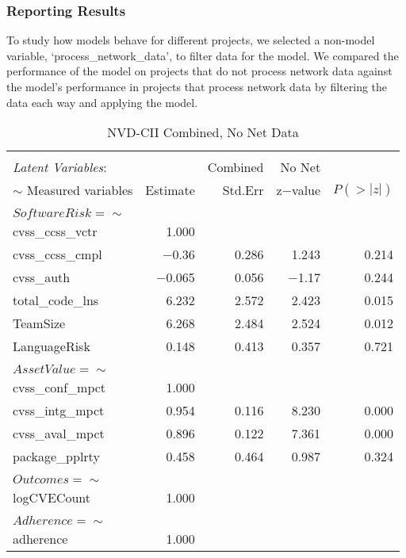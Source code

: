 \subsubsection{Reporting Results}
To study how models behave for different projects, we selected a non-model variable, `process\_network\_data', to filter data for the model. We compared the performance of the model on projects that do not process network data against the model's performance in projects that process network data by filtering the data each way and applying the model.

\begin{table}
	\begin{center}	
		\caption{NVD-CII Combined, No Net Data}
		\label{tab:results_combined1}
		\begin{tabular}{l|rrrr}
			\\[-1.8ex]\hline 
			\hline \\[-1.8ex] 
			\textit{Latent Variables}: &  & Combined & No Net & \\  
			$\sim$ Measured variables& Estimate & Std.Err & z$-$value & $P(>|z|)$ \\
			\hline \\[-1.8ex]
			$SoftwareRisk =\sim$  & & & & \\                                   
			cvss\_ccss\_vctr   & 1.000 & &  & \\                             
			cvss\_ccss\_cmpl &  $-$0.36 &   0.286 & 1.243 &   0.214\\
			cvss\_auth     &   $-$0.065  &  0.056  & $-$1.17   & 0.244\\
			total\_code\_lns  &  6.232 &   2.572 &   2.423 &   0.015\\
			TeamSize        &  6.268   & 2.484   & 2.524   & 0.012\\
			LanguageRisk    &  0.148  &  0.413   & 0.357   & 0.721\\ 
			& & & & \\  
			$AssetValue =\sim$     & & & & \\                                    		
		    cvss\_conf\_mpct  &  1.000  &	&	&                  \\
		    cvss\_intg\_mpct  &  0.954  &  0.116 &   8.230  &  0.000\\
		    cvss\_aval\_mpct  &  0.896 &   0.122 &   7.361 &   0.000\\
		    package\_pplrty  &  0.458 &   0.464  &  0.987 &   0.324\\	
			& & & & \\  
			$Outcomes =\sim$    & & & & \\                                     
			logCVECount     &  1.000  & & & \\                          
			& & & & \\  
			$Adherence =\sim$   & & & & \\                                      
			adherence    &     1.000        & & & \\    
			

\end{tabular}
\end{center}
\end{table}
